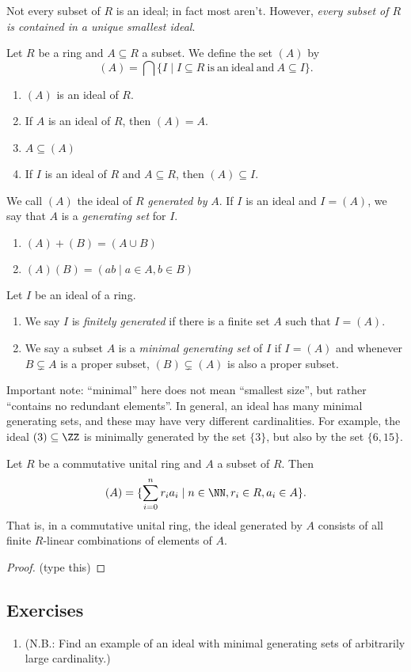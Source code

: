 \documentclass{article}
\begin{document}
Not every subset of $R$ is an ideal; in fact most aren't. However, \emph{every subset of $R$ is contained in a unique smallest ideal}.

\begin{prop}
Let $R$ be a ring and $A \subseteq R$ a subset. We define the set $(A)$ by \[ (A) = \bigcap \{ I \mid I \subseteq R\ \mathrm{is\ an\ ideal\ and}\ A \subseteq I \}. \]
\begin{enumerate}
\item $(A)$ is an ideal of $R$.
\item If $A$ is an ideal of $R$, then $(A) = A$.
\item $A \subseteq (A)$
\item If $I$ is an ideal of $R$ and $A \subseteq R$, then $(A) \subseteq I$.
\end{enumerate}
We call $(A)$ the ideal of $R$ \emph{generated by} $A$. If $I$ is an ideal and $I = (A)$, we say that $A$ is a \emph{generating set} for $I$.
\end{prop}

\begin{prop} \mbox{}
\begin{enumerate}
\item $(A) + (B) = (A \cup B)$
\item $(A)(B) = (ab \mid a \in A, b \in B)$
\end{enumerate}
\end{prop}

\begin{dfn}
Let $I$ be an ideal of a ring.
\begin{enumerate}
\item We say $I$ is \emph{finitely generated} if there is a finite set $A$ such that $I = (A)$.
\item We say a subset $A$ is a \emph{minimal generating set} of $I$ if $I = (A)$ and whenever $B \subsetneq A$ is a proper subset, $(B) \subsetneq (A)$ is also a proper subset.
\end{enumerate}
\end{dfn}

Important note: ``minimal'' here does not mean ``smallest size'', but rather ``contains no redundant elements''. In general, an ideal has many minimal generating sets, and these may have very different cardinalities. For example, the ideal $(3) \subseteq \ZZ$ is minimally generated by the set $\{3\}$, but also by the set $\{6,15\}$.

\begin{prop}
Let $R$ be a commutative unital ring and $A$ a subset of $R$. Then \[ (A) = \{ \sum_{i=0}^n r_ia_i \mid n \in \NN, r_i \in R, a_i \in A \}. \] That is, in a commutative unital ring, the ideal generated by $A$ consists of all finite $R$-linear combinations of elements of $A$.
\end{prop}

\begin{proof}
(type this)
\end{proof}

\subsection*{Exercises}

\begin{enumerate}
\item (N.B.: Find an example of an ideal with minimal generating sets of arbitrarily large cardinality.)
\end{enumerate}
\end{document}
